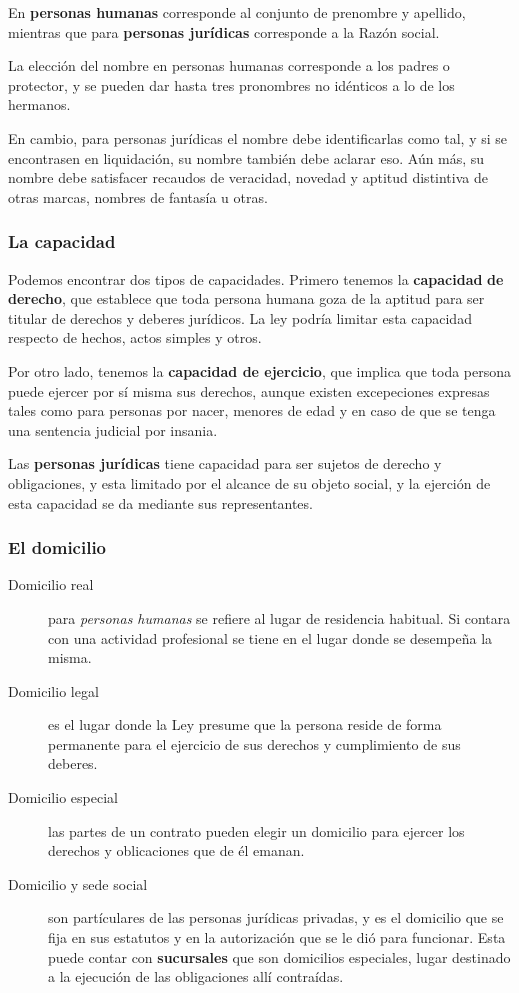 \documentclass[../main.tex]{subfiles}
\begin{document}
En \textbf{personas humanas} corresponde al conjunto de prenombre y apellido, 
mientras que para \textbf{personas jurídicas} corresponde a la Razón social.

La elección del nombre en personas humanas corresponde a los padres o protector,
y se pueden dar hasta tres pronombres no idénticos a lo de los hermanos. 

En cambio, para personas jurídicas el nombre debe identificarlas como tal, y si se
encontrasen en liquidación, su nombre también debe aclarar eso. Aún más, su nombre
debe satisfacer recaudos de veracidad, novedad y aptitud distintiva de otras 
marcas, nombres de fantasía u otras.

\subsubsection{La capacidad}

Podemos encontrar dos tipos de capacidades. Primero tenemos la \textbf{capacidad}
\textbf{de derecho}, que establece que toda persona humana goza de la aptitud para
ser titular de derechos y deberes jurídicos. La ley podría limitar esta capacidad
respecto de hechos, actos simples y otros. 

Por otro lado, tenemos la \textbf{capacidad de ejercicio}, que implica que toda 
persona puede ejercer por sí misma sus derechos, aunque existen excepeciones
expresas tales como para personas por nacer, menores de edad y en caso de que se
tenga una sentencia judicial por insania.

Las \textbf{personas jurídicas} tiene capacidad para ser sujetos de derecho y 
obligaciones, y esta limitado por el alcance de su objeto social, y la ejerción
de esta capacidad se da mediante sus representantes.

\subsubsection{El domicilio}

\begin{description}
  \item[Domicilio real] para \textit{personas humanas} se refiere al lugar de
    residencia habitual. Si contara con una actividad profesional se tiene en el
    lugar donde se desempeña la misma.
  \item[Domicilio legal] es el lugar donde la Ley presume que la persona reside de
    forma permanente para el ejercicio de sus derechos y cumplimiento de sus deberes.
  \item[Domicilio especial] las partes de un contrato pueden elegir un domicilio
    para ejercer los derechos y oblicaciones que de él emanan.
  \item[Domicilio y sede social] son partículares de las personas jurídicas privadas,
    y es el domicilio que se fija en sus estatutos y en la autorización que se le
    dió para funcionar. Esta puede contar con \textbf{sucursales} que son domicilios
    especiales, lugar destinado a la ejecución de las obligaciones allí contraídas.
\end{description}
\end{document}
